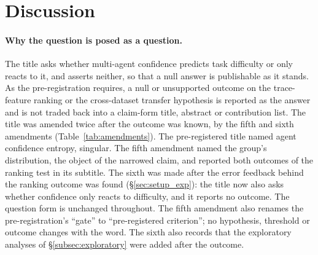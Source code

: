 \documentclass[10pt,a4paper]{article}
\begin{document}
\section{Discussion}\label{sec:discussion}

\paragraph{Why the question is posed as a question.} The title asks whether
multi-agent confidence predicts task difficulty or only reacts to it, and asserts
neither, so that a null answer is publishable as it
stands. As the pre-registration requires, a null or unsupported outcome on the
trace-feature ranking or the cross-dataset transfer hypothesis is reported as the
answer and is not traded back into a claim-form title, abstract or contribution
list. The title was amended twice after the outcome was known, by the fifth and
sixth amendments (Table~\ref{tab:amendments}). The pre-registered title named agent
confidence entropy, singular. The fifth amendment named the group's distribution, the
object of the narrowed claim, and reported both outcomes of the ranking test in its
subtitle. The sixth was made after the error feedback behind the ranking outcome was
found (\S\ref{sec:setup_exp}): the title now also asks whether confidence only reacts
to difficulty, and it reports no outcome. The question form is unchanged throughout.
The fifth amendment also renames the
pre-registration's ``gate'' to ``pre-registered criterion''; no hypothesis,
threshold or outcome changes with the word. The sixth also records that the
exploratory analyses of \S\ref{subsec:exploratory} were added after the outcome.
\end{document}
